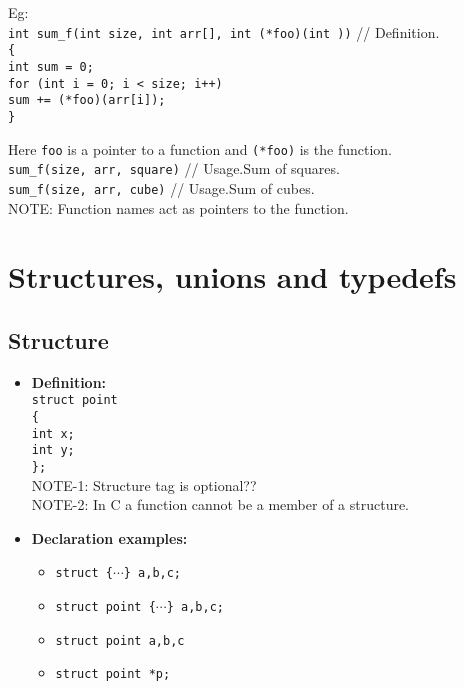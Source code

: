 \begin{multicols*}{3}
Eg: \\
\texttt{int sum\_f(int size, int arr[], int (*foo)(int ))} // Definition.\\
\texttt{\{}\\
\qquad \texttt{int sum = 0;}\\
\qquad \texttt{for (int i = 0; i < size; i++)}\\
\qquad \qquad \texttt{sum += (*foo)(arr[i]);}\\
\texttt{\}}

Here \texttt{foo} is a pointer to a function and \texttt{(*foo)} is the function.\\

\texttt{sum\_f(size, arr, square)} // Usage.Sum of squares.\\
\texttt{sum\_f(size, arr, cube)} // Usage.Sum of cubes.\\

NOTE: Function names act as pointers to the function. \\


\vfill \null
\columnbreak

\section{Structures, unions and typedefs}

\subsection{Structure}

\begin{itemize}
\item \textbf{Definition:}\\
\texttt{struct point}\\
\texttt{\{}\\
\qquad \texttt{int x;}\\
\qquad \texttt{int y;}\\
\texttt{\};}\\

NOTE-1: Structure tag is optional??\\
NOTE-2: In C  a function cannot be a member of a structure.\\

\item \textbf{Declaration examples:}\\
\begin{itemize}
\item \texttt{struct \{$\cdots$\} a,b,c;}\\
\item \texttt{struct point \{$\cdots$\} a,b,c;}\\
\item \texttt{struct point a,b,c}\\
\item \texttt{struct point *p;}\\
\end{itemize}


\end{itemize}
\end{multicols*}
